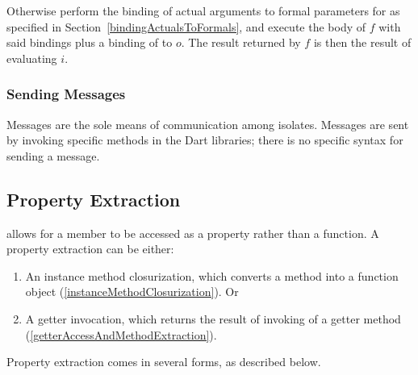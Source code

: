 \documentclass[makeidx]{article}
\begin{document}
{{

\LMHash{}%
Otherwise perform the binding of actual arguments to formal parameters for
as specified in Section~\ref{bindingActualsToFormals},
and execute the body of $f$ with said bindings
plus a binding of \THIS{} to $o$.
The result returned by $f$ is then the result of evaluating $i$.

} %


\subsubsection{Sending Messages}

\LMHash{}%
Messages are the sole means of communication among isolates.
Messages are sent by invoking specific methods in the Dart libraries; there is no specific syntax for sending a message.



\subsection{Property Extraction}

\LMHash{}%
allows for a member to be accessed as a property rather than a function.
A property extraction can be either:

\begin{enumerate}
\item An instance method closurization,
  which converts a method into a function object
  (\ref{instanceMethodClosurization}).
  Or
\item A getter invocation, which returns
  the result of invoking of a getter method
  (\ref{getterAccessAndMethodExtraction}).
\end{enumerate}


\LMHash{}%
Property extraction comes in several forms, as described below.

}
\end{document}
